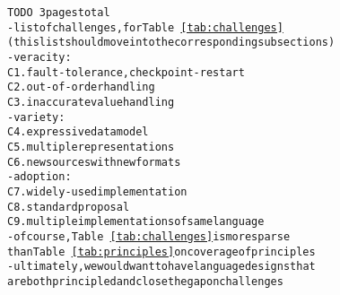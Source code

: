 \begin{alltt}TODO\scriptsize ~3 pages total
- list of challenges, for Table~\ref{tab:challenges}
  (this list should move into the corresponding subsections)
  - veracity:
    C1. fault-tolerance, checkpoint-restart
    C2. out-of-order handling
    C3. inaccurate value handling
  - variety:
    C4. expressive data model
    C5. multiple representations
    C6. new sources with new formats
  - adoption:
    C7. widely-used implementation
    C8. standard proposal
    C9. multiple implementations of same language
- of course, Table~\ref{tab:challenges} is more sparse
  than Table~\ref{tab:principles} on coverage of principles
- ultimately, we would want to have language designs that
  are both principled and close the gap on challenges
\end{alltt}

